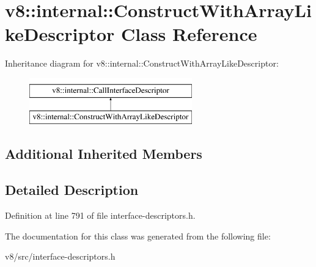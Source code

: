 \hypertarget{classv8_1_1internal_1_1ConstructWithArrayLikeDescriptor}{}\section{v8\+:\+:internal\+:\+:Construct\+With\+Array\+Like\+Descriptor Class Reference}
\label{classv8_1_1internal_1_1ConstructWithArrayLikeDescriptor}
Inheritance diagram for v8\+:\+:internal\+:\+:Construct\+With\+Array\+Like\+Descriptor\+:\begin{figure}[H]
\begin{center}
\leavevmode
\includegraphics[height=2.000000cm]{classv8_1_1internal_1_1ConstructWithArrayLikeDescriptor}
\end{center}
\end{figure}
\subsection*{Additional Inherited Members}


\subsection{Detailed Description}


Definition at line 791 of file interface-\/descriptors.\+h.



The documentation for this class was generated from the following file\+:\begin{DoxyCompactItemize}
\item 
v8/src/interface-\/descriptors.\+h\end{DoxyCompactItemize}
